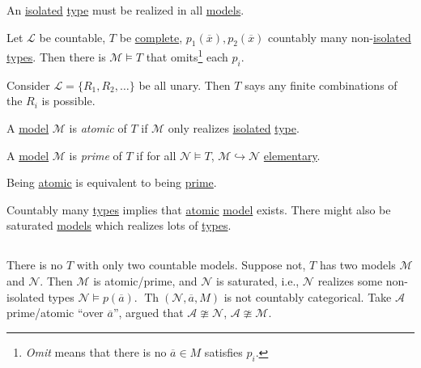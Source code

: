 An \hyperref[def:isolated]{isolated} \hyperref[def:type]{type} must be realized in all \hyperref[def:model]{models}.

\begin{theorem}\label{thm:omitting-types}
	Let \(\mathcal{L} \) be countable, \(T\) be \hyperref[def:theory-complete]{complete}, \(p_1(\overline{x} ), p_2(\overline{x} )\) countably many non-\hyperref[def:isolated]{isolated} \hyperref[def:type]{types}. Then there is \(\mathcal{M} \models T\) that omits\footnote{\emph{Omit} means that there is no \(\overline{a} \in M\) satisfies \(p_i\).} each \(p_i\).
\end{theorem}

\begin{eg}
	Consider \(\mathcal{L} = \{ R_1, R_2, \dots \} \) be all unary. Then \(T\) says any finite combinations of the \(R_i\) is possible.
\end{eg}

\begin{definition}[Atomic]\label{def:atomic}
	A \hyperref[def:model]{model} \(\mathcal{M} \) is \emph{atomic} of \(T\) if \(\mathcal{M} \) only realizes \hyperref[def:isolated]{isolated} \hyperref[def:type]{type}.
\end{definition}

\begin{definition}[Prime]\label{def:prime}
	A \hyperref[def:model]{model} \(\mathcal{M} \) is \emph{prime} of \(T\) if for all \(\mathcal{N} \models T\), \(\mathcal{M} \hookrightarrow \mathcal{N} \) \hyperref[def:elementary-embedding]{elementary}.
\end{definition}

\begin{theorem}
	Being \hyperref[def:atomic]{atomic} is equivalent to being \hyperref[def:prime]{prime}.
\end{theorem}

Countably many \hyperref[def:type]{types} implies that \hyperref[def:atomic]{atomic} \hyperref[def:model]{model} exists. There might also be saturated \hyperref[def:model]{models} which realizes lots of \hyperref[def:type]{types}.

\subsection{}
There is no \(T\) with only two countable models. Suppose not, \(T\) has two models \(\mathcal{M} \) and \(\mathcal{N} \). Then \(\mathcal{M} \) is atomic/prime, and \(\mathcal{N} \) is saturated, i.e., \(\mathcal{N} \) realizes some non-isolated types \(\mathcal{N} \models p(\overline{a} )\). \(\mathop{\mathrm{Th}}(\mathcal{N} , \overline{a} , M) \) is not countably categorical. Take \(\mathcal{A} \) prime/atomic ``over \(\overline{a} \)'', argued that \(\mathcal{A} \ncong \mathcal{N} \), \(\mathcal{A} \ncong \mathcal{M} \).